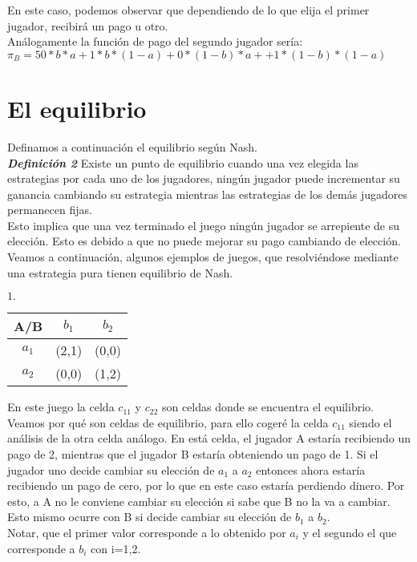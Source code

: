 \documentclass[10pt,a4paper]{book}
\begin{document}
En este caso, podemos observar que dependiendo de lo que elija el primer jugador, recibirá un pago u otro.\\

Análogamente la función de pago del segundo jugador sería:\\

$ \pi_B= 50*b*a + 1*b*(1-a)+ 0*(1-b)*a +  + 1*(1-b)*(1-a)$ \\


\newpage

\section{El equilibrio}		

Definamos a continuación el equilibrio según Nash.\\
	
\textit{\textbf{Definición 2}} Existe un punto de equilibrio cuando una vez elegida las estrategias por cada uno de los jugadores, ningún jugador puede incrementar su ganancia cambiando su estrategia mientras las estrategias de los demás jugadores permanecen fijas.\\

Esto implica que una vez terminado el juego ningún jugador se arrepiente de su elección. Esto es debido a que no puede mejorar su pago cambiando de elección.\\


Veamos a continuación, algunos ejemplos de juegos, que resolviéndose mediante una estrategia pura tienen equilibrio de Nash.\\ 


\begin{center}
	$1. \quad$
	\begin{tabular}{|c|c|c|}
		\hline
		A/B & $b_1$ & $b_2$ \\
		\hline
		$a_1$ & (2,1) & (0,0) \\
		\hline
		$a_2$ & (0,0) & (1,2) \\
		\hline
	\end{tabular}
\end{center}

En este juego la celda $c_{11}$ y $c_{22}$ son celdas donde se encuentra el equilibrio. Veamos por qué son celdas de equilibrio, para ello cogeré la celda  $c_{11}$ siendo el análisis de la otra celda análogo. En está celda, el jugador A estaría recibiendo un pago de 2, mientras que el jugador B estaría obteniendo un pago de 1. Si el jugador uno decide cambiar su elección de $a_1$ a $a_2$ entonces ahora estaría recibiendo un pago de cero, por lo que en este caso estaría perdiendo dinero. Por esto, a A no le conviene cambiar su elección si sabe que B no la va a cambiar. Esto mismo ocurre con B si decide cambiar su elección de $b_1$ a $b_2$.\\
Notar, que el primer valor corresponde a lo obtenido por $a_i$ y el segundo el que corresponde a $b_i$ con i=1,2.\\
\end{document}
